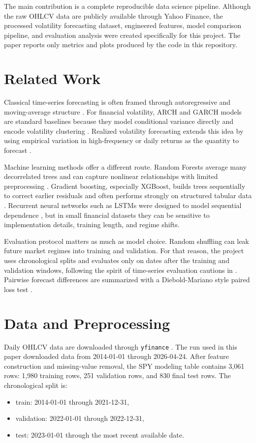 \documentclass{article}
\begin{document}
The main contribution is a complete reproducible data science pipeline. Although the raw OHLCV data are publicly available through Yahoo Finance, the processed volatility forecasting dataset, engineered features, model comparison pipeline, and evaluation analysis were created specifically for this project. The paper reports only metrics and plots produced by the code in this repository.

\section{Related Work}
Classical time-series forecasting is often framed through autoregressive and moving-average structure \citep{box2015time}. For financial volatility, ARCH and GARCH models are standard baselines because they model conditional variance directly and encode volatility clustering \citep{engle1982arch,bollerslev1986garch}. Realized volatility forecasting extends this idea by using empirical variation in high-frequency or daily returns as the quantity to forecast \citep{andersen2003realized}.

Machine learning methods offer a different route. Random Forests average many decorrelated trees and can capture nonlinear relationships with limited preprocessing \citep{breiman2001random}. Gradient boosting, especially XGBoost, builds trees sequentially to correct earlier residuals and often performs strongly on structured tabular data \citep{chen2016xgboost}. Recurrent neural networks such as LSTMs were designed to model sequential dependence \citep{hochreiter1997lstm}, but in small financial datasets they can be sensitive to implementation details, training length, and regime shifts.

Evaluation protocol matters as much as model choice. Random shuffling can leak future market regimes into training and validation. For that reason, the project uses chronological splits and evaluates only on dates after the training and validation windows, following the spirit of time-series evaluation cautions in \citet{bergmeir2018note}. Pairwise forecast differences are summarized with a Diebold-Mariano style paired loss test \citep{diebold1995comparing}.

\section{Data and Preprocessing}
Daily OHLCV data are downloaded through \texttt{yfinance} \citep{yfinance}. The run used in this paper downloaded data from 2014-01-01 through 2026-04-24. After feature construction and missing-value removal, the SPY modeling table contains 3,061 rows: 1,980 training rows, 251 validation rows, and 830 final test rows. The chronological split is:
\begin{itemize}
  \item train: 2014-01-01 through 2021-12-31,
  \item validation: 2022-01-01 through 2022-12-31,
  \item test: 2023-01-01 through the most recent available date.
\end{itemize}
\end{document}
